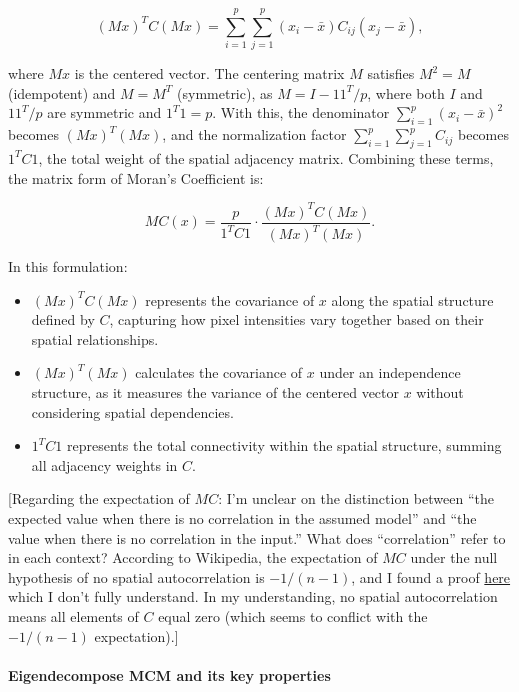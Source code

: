 \documentclass[12pt]{article}
\begin{document}
\[
  (Mx)^T C (Mx) = \sum_{i=1}^p \sum_{j=1}^p (x_i - \bar{x}) C_{ij} (x_j - \bar{x}),
\]

where \( Mx \) is the centered vector. The centering matrix \( M \) satisfies \( M^2 = M \) (idempotent) and \( M = M^T \) (symmetric), as \( M = I - 1 1^T/p \), where both \( I \) and \( 1 1^T/p \) are symmetric and \( 1^T 1 = p \). With this, the denominator \( \sum_{i=1}^p (x_i - \bar{x})^2 \) becomes \( (Mx)^T (Mx) \), and the normalization factor \( \sum_{i=1}^p \sum_{j=1}^p C_{ij} \) becomes \( 1^T C 1 \), the total weight of the spatial adjacency matrix. Combining these terms, the matrix form of Moran's Coefficient is:

\[
  MC(x) = \frac{p}{1^T C 1} \cdot \frac{(Mx)^T C (Mx)}{(Mx)^T (Mx)}.
\]

In this formulation:
\begin{itemize}
    \item \( (Mx)^T C (Mx) \) represents the covariance of \( x \) along the spatial structure defined by \( C \), capturing how pixel intensities vary together based on their spatial relationships.
    \item \( (Mx)^T (Mx) \) calculates the covariance of \( x \) under an independence structure, as it measures the variance of the centered vector \( x \) without considering spatial dependencies.
    \item \( 1^T C 1 \) represents the total connectivity within the spatial structure, summing all adjacency weights in \( C \).
\end{itemize}

[Regarding the expectation of \( M C \): I'm unclear on the distinction between ``the expected value when there is no correlation in the assumed model'' and ``the value when there is no correlation in the input.'' What does ``correlation'' refer to in each context? According to Wikipedia, the expectation of \( M C \) under the null hypothesis of no spatial autocorrelation is \( -1 / (n - 1) \), and I found a proof \href{https://stats.stackexchange.com/questions/567411/expectation-and-variance-of-morans-i-under-the-null}{here} which I don’t fully understand. In my understanding, no spatial autocorrelation means all elements of \( C \) equal zero (which seems to conflict with the \( -1 / (n - 1) \) expectation).]

\paragraph{Eigendecompose MCM and its key properties}
\end{document}
